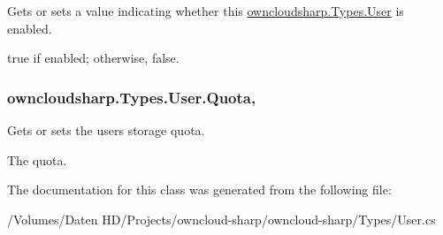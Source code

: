 Gets or sets a value indicating whether this \hyperlink{classowncloudsharp_1_1_types_1_1_user}{owncloudsharp.\+Types.\+User} is enabled. 

{\ttfamily true} if enabled; otherwise, {\ttfamily false}.\hypertarget{classowncloudsharp_1_1_types_1_1_user_aff24ca447feae66be8ef929cd94a2d21}{}
\subsubsection[{Quota}]{ owncloudsharp.\+Types.\+User.\+Quota\hspace{0.3cm}{\ttfamily [get]}, {\ttfamily [set]}}\label{classowncloudsharp_1_1_types_1_1_user_aff24ca447feae66be8ef929cd94a2d21}


Gets or sets the users storage quota. 

The quota.

The documentation for this class was generated from the following file\+:\begin{DoxyCompactItemize}
\item 
/\+Volumes/\+Daten H\+D/\+Projects/owncloud-\/sharp/owncloud-\/sharp/\+Types/User.\+cs\end{DoxyCompactItemize}
